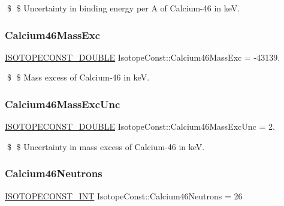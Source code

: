 \$ \$ Uncertainty in binding energy per A of Calcium-\/46 in keV. \mbox{\label{group___isotope_const-_calcium-_ca46_ga8d33e0bee71313e13b5ec1ad1f0f6b0b}} 
\subsubsection{\texorpdfstring{Calcium46\+Mass\+Exc}{Calcium46MassExc}}
{\footnotesize\ttfamily \mbox{\hyperlink{group___isotope_const-_macros_ga8f45a7272ce02c0b4c65c44636ed719a}{I\+S\+O\+T\+O\+P\+E\+C\+O\+N\+S\+T\+\_\+\+D\+O\+U\+B\+LE}} Isotope\+Const\+::\+Calcium46\+Mass\+Exc = -\/43139.}

\$ \$ Mass excess of Calcium-\/46 in keV. \mbox{\label{group___isotope_const-_calcium-_ca46_ga644045e034f11df5fd7b89ecdda44658}} 
\subsubsection{\texorpdfstring{Calcium46\+Mass\+Exc\+Unc}{Calcium46MassExcUnc}}
{\footnotesize\ttfamily \mbox{\hyperlink{group___isotope_const-_macros_ga8f45a7272ce02c0b4c65c44636ed719a}{I\+S\+O\+T\+O\+P\+E\+C\+O\+N\+S\+T\+\_\+\+D\+O\+U\+B\+LE}} Isotope\+Const\+::\+Calcium46\+Mass\+Exc\+Unc = 2.}

\$ \$ Uncertainty in mass excess of Calcium-\/46 in keV. \mbox{\label{group___isotope_const-_calcium-_ca46_ga3702e9c6374a68bec9abf13266755795}} 
\subsubsection{\texorpdfstring{Calcium46\+Neutrons}{Calcium46Neutrons}}
{\footnotesize\ttfamily \mbox{\hyperlink{group___isotope_const-_macros_ga5f18360b3e99483a35c32d789e62621c}{I\+S\+O\+T\+O\+P\+E\+C\+O\+N\+S\+T\+\_\+\+I\+NT}} Isotope\+Const\+::\+Calcium46\+Neutrons = 26}

